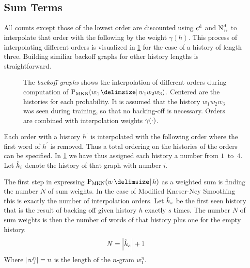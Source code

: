 \subsection{Sum Terms}

All counts except those of the lowest order are discounted using
$\DiscountedCount$ and $\DiscountedCount*$ to interpolate that order with the
following by the weight $\gamma(h)$.
This process of interpolating different orders is visualized in
\cref{fig:history-mkn} for the case of a history of length three.
Building similiar backoff graphs for other history lengths is straightforward.

\begin{figure}[tb]
  \centering
  
  \caption{
    The \emph{backoff graphs} shows the interpolation of different orders during
    computation of $\ProbMKN{w_4}{w_1 w_2 w_3}$.
    Centered are the histories for each probability.
    It is assumed that the history $w_1 w_2 w_3$ was seen during training, so
    that no backing-off is necessary.
    Orders are combined with interpolation weights $\gamma(\cdot)$.
  }
  \label{fig:history-mkn}
\end{figure}

Each order with a history $h^\prime$ is interpolated with the following order where
the first word of $h^\prime$ is removed.
Thus a total ordering on the histories of the orders can be specified.
In \cref{fig:history-mkn} we have thus assigned each history a number from
$1$~to~$4$.
Let $\DerivedHistory[i]$ denote the history of that graph with number $i$.

The first step in expressing $\ProbMKN{w}{h}$ as a weighted sum is finding the
number $N$ of sum weights.
In the case of Modified Kneser-Ney Smoothing this is exactly the number of
interpolation orders.
Let $\DerivedHistory[s]$ be the first seen history that is the result of
backing off given history $h$ exactly $s$ times.
The number $N$ of sum weights is then the number of words of that history plus
one for the empty history.
\begin{equation}
  \label{eq:weightedsum-mkn-num}
  N = \NGramLength{\DerivedHistory[s]} + 1
\end{equation}
Where ${\left|w_1^n\right|} = n$ is the length of the $n$-gram $w_1^n$.

